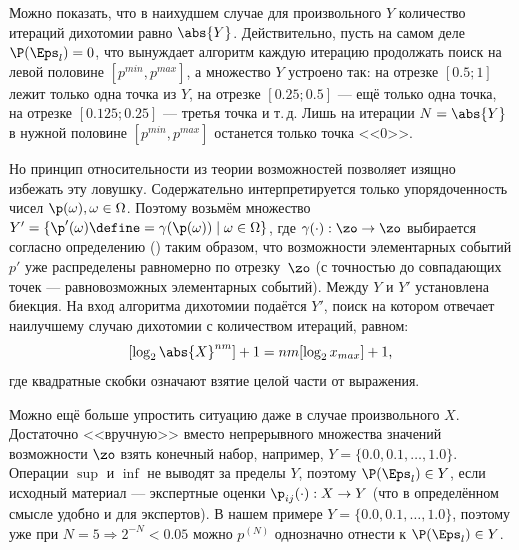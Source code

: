 Можно показать, что в наихудшем случае для произвольного $Y$ количество итераций дихотомии равно $\abs{Y}$. 
Действительно, пусть на самом деле $\P(\Eps_l) = 0$, что вынуждает алгоритм каждую итерацию продолжать поиск на левой половине $[p^{min}, p^{max}]$, а множество $Y$ устроено так: на отрезке $[0.5;  1]$ лежит только одна точка из $Y$, на отрезке $[0.25;  0.5]$ --- ещё только одна точка, на отрезке $[0.125;  0.25]$ --- третья точка и т.\,д. Лишь на итерации $N = \abs{Y}$ в нужной половине $[p^{min}, p^{max}]$ останется только точка <<$0$>>. 

Но принцип относительности из теории возможностей позволяет изящно избежать эту ловушку. Содержательно интерпретируется только упорядоченность чисел $\p(\omega), \omega\in\Omega$. Поэтому возьмём множество $Y' = \{\p'(\omega) \define= \gamma(\p(\omega))\mid\omega\in\Omega\}$, где $\gamma(\cdot): \zo \to \zo$ выбирается согласно определению () таким образом, что возможности элементарных событий $p'$ уже распределены равномерно по отрезку~$\zo$ (с точностью до совпадающих точек --- равновозможных элементарных событий). Между $Y$ и $Y'$ установлена биекция. На вход алгоритма дихотомии подаётся $Y'$, поиск на котором отвечает наилучшему случаю дихотомии с количеством итераций, равном:
\begin{equation*}
  \label{e:}
  [ \log_{2}{\abs{X}^{nm}} ] + 1 = nm[ \log_{2}{x_{max}} ] + 1,
\end{equation*}
 где квадратные скобки означают взятие целой части от выражения.
 

Можно ещё больше упростить ситуацию даже в случае произвольного $X$. Достаточно <<вручную>> вместо непрерывного множества значений возможности $\zo$ взять конечный набор, например, $Y = \{0.0, 0.1, \ldots, 1.0\}$. Операции $\sup$ и $\inf$ не выводят за пределы $Y$, поэтому $\P(\Eps_l) \in Y$, если исходный материал --- экспертные оценки $\p_{ij}(\cdot): X \rightarrow Y$ (что в определённом смысле удобно и для экспертов). В нашем примере $Y = \{0.0, 0.1, \ldots, 1.0\}$, поэтому уже при $N = 5 \Rightarrow 2^{-N} < 0.05$ можно $p^{(N)}$ однозначно отнести к $\P(\Eps_l) \in Y$.

